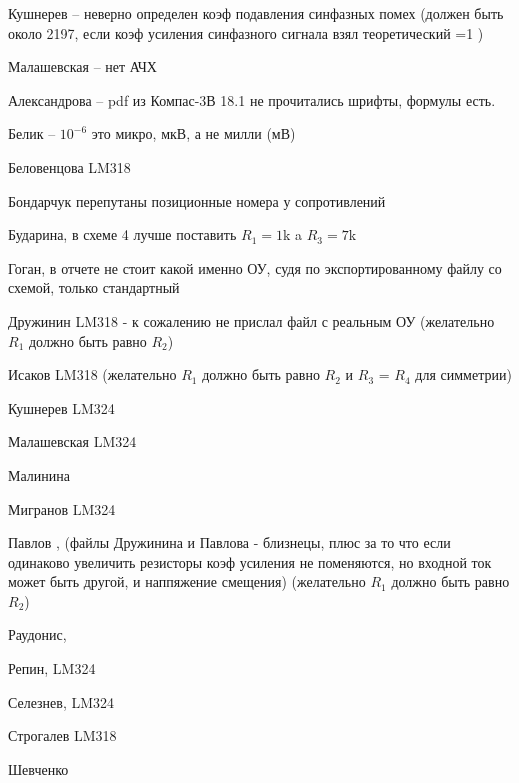\documentclass[a4paper,11pt]{article}
\begin{document}
\newpage
Кушнерев -- неверно определен коэф подавления синфазных помех (должен быть около 2197, если коэф усиления синфазного сигнала взял теоретический =1 )

Малашевская -- нет АЧХ

\newpage

Александрова -- pdf из Компас-3В 18.1 не прочитались шрифты, формулы есть.

Белик        -- $10^{-6}$ это микро, мкВ, а не милли (мВ)

Беловенцова     LM318

Бондарчук  перепутаны позиционные номера у сопротивлений

Бударина, в схеме 4 лучше поставить $R_1=1$k a $R_3=7$k

Гоган, в отчете не стоит какой именно ОУ, судя по экспортированному файлу со схемой, только стандартный

Дружинин  LM318 - к сожалению не прислал файл с реальным ОУ (желательно $R_1$ должно быть равно $R_2$)

Исаков  LM318 (желательно $R_1$ должно быть равно $R_2$ и $R_3$ = $R_4$  для симметрии)

Кушнерев LM324

Малашевская LM324

Малинина

Мигранов LM324

Павлов , (файлы Дружинина и Павлова - близнецы, плюс за то что если одинаково увеличить резисторы коэф усиления не поменяются, но входной ток может быть другой, и наппяжение смещения)
(желательно $R_1$ должно быть равно $R_2$)

Раудонис, 

Репин, LM324

Селезнев, LM324

Строгалев LM318

Шевченко
\end{document}
